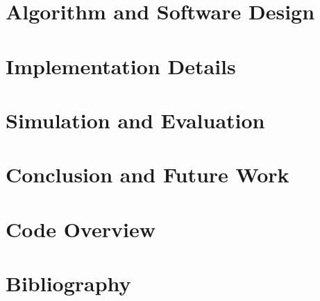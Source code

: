 \documentclass[ieee]{uob-thesis}
\begin{document}
  

\chapter{Algorithm and Software Design}
\label{chap_design}

  

\chapter{Implementation Details}
\label{chap_impl}

  

\chapter{Simulation and Evaluation}
\label{chap_sim}

  

\chapter{Conclusion and Future Work}
\label{chap_fw}

  


\appendix

\chapter{Code Overview}
\label{app_code}

  


\clearpage

\backmatter

\chapter*{Bibliography}

\printbibliography[heading=none]
\end{document}
